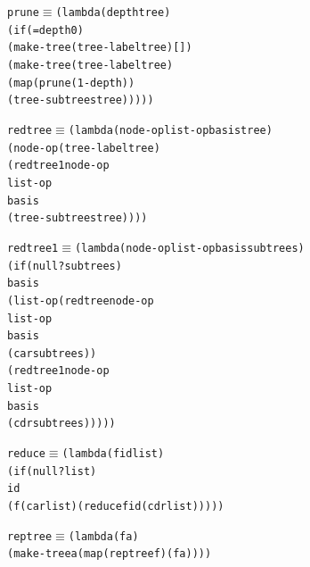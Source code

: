 \noindent\begin{minipage}{\linewidth}
\begin{alltt}
prune \(\equiv\) (lambda (depth tree)
          (if (= depth 0)
              (make-tree (tree-label tree) [])
              (make-tree (tree-label tree)
                         (map (prune (1- depth))
                              (tree-subtrees tree)))))
\end{alltt}
\end{minipage}\par\bigskip

\noindent\begin{minipage}{\linewidth}
\begin{alltt}
redtree \(\equiv\) (lambda (node-op list-op basis tree)
            (node-op (tree-label tree)
                     (redtree1 node-op
                               list-op
                               basis
                               (tree-subtrees tree))))
\end{alltt}
\end{minipage}\par\bigskip

\noindent\begin{minipage}{\linewidth}
\begin{alltt}
redtree1 \(\equiv\) (lambda (node-op list-op basis subtrees)
             (if (null? subtrees)
                 basis
                 (list-op (redtree node-op
                                   list-op
                                   basis
                                   (car subtrees))
                          (redtree1 node-op
                                    list-op
                                    basis
                                    (cdr subtrees)))))
\end{alltt}
\end{minipage}\par\bigskip

\noindent\begin{minipage}{\linewidth}
\begin{alltt}
reduce \(\equiv\) (lambda (f id list)
           (if (null? list)
               id
               (f (car list) (reduce f id (cdr list)))))
\end{alltt}
\end{minipage}\par\bigskip

\noindent\begin{minipage}{\linewidth}
\begin{alltt}
reptree \(\equiv\) (lambda (f a)
            (make-tree a (map (reptree f) (f a))))
\end{alltt}
\end{minipage}\par\bigskip

